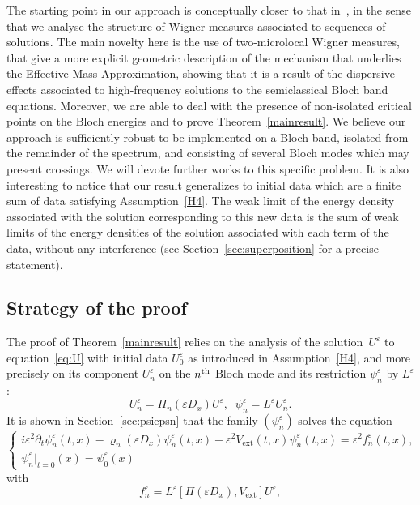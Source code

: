 \documentclass[10pt]{amsart}
\theoremstyle{definition}
\DeclareMathOperator{\ext}{ext}
\newcommand*\eps{\varepsilon}
\numberwithin{equation}{section}
\begin{document}
The starting point in our approach is conceptually closer to that in~\cite{PR96}, in the sense that we analyse the structure of Wigner measures associated to sequences of solutions. The main novelty here is the use of two-microlocal Wigner measures, that give a more explicit geometric description of the mechanism that underlies the Effective Mass Approximation, showing that it is a result of the dispersive effects associated to high-frequency solutions to the semiclassical Bloch band equations. Moreover, we are able to deal with the presence of non-isolated critical points on the Bloch energies and to prove Theorem~\ref{mainresult}. We believe our approach is sufficiently robust to be implemented on a Bloch band, isolated from the remainder of the spectrum, and consisting of several Bloch modes which may present crossings. We will devote further works to this specific problem. It is also interesting to notice that our result generalizes to initial data which are a finite sum of data satisfying Assumption~\eqref{H4}. The weak limit of the energy density associated with the solution corresponding to this new data is the sum of weak limits of the energy densities of the solution associated with each term of the data, without any interference (see Section~\ref{sec:superposition} for a precise statement).



\subsection{Strategy of the proof}

The proof of Theorem~\ref{mainresult} relies on the analysis of the solution~$U^\eps$ to equation~\eqref{eq:U} with initial data $U^\eps_0$ as introduced in Assumption~\eqref{H4}, and more precisely on its component $U^\eps_n$ on the $n^{\rm th}$ Bloch mode and its restriction $\psi^\eps_n$ by $L^\eps$:
\[
U^\eps_n= \Pi_n(\eps D_x)U^\eps,\;\;
\psi^\eps_n = L^\eps U^\eps_n.
\]
It is shown in Section~\ref{sec:psiepsn} that the family $(\psi^\eps_n)$ solves the equation
\begin{equation}\label{eq:U_components}
\begin{cases}
i\eps^2 \partial_{t} \psi^\eps_{n} (t,x)- \varrho_{n}(\eps D_x) \psi^\eps_{n}(t,x)- \eps^2 V_{\ext}(t,x) \psi^\eps_{n}(t,x)= \eps^2 f^\eps_n(t,x),\\
\psi^\eps_{n}|_{t=0}(x)= \psi_{0}^{\eps}(x)
\end{cases}
\end{equation}
with
\[
f^\eps_n=L^\eps \left[\Pi(\eps D_x), V_{\ext}\right] U^\eps,
\]
\end{document}
